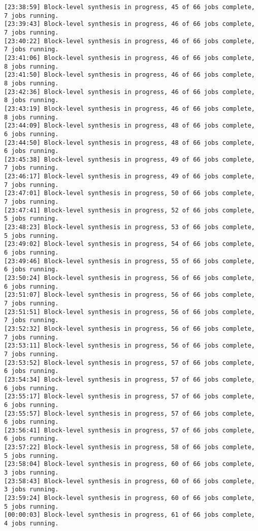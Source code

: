 \begin{lstlisting}[label=lst:code_2,caption=Содержимое файла  v++*.log]
[23:38:59] Block-level synthesis in progress, 45 of 66 jobs complete, 7 jobs running.
[23:39:43] Block-level synthesis in progress, 46 of 66 jobs complete, 7 jobs running.
[23:40:22] Block-level synthesis in progress, 46 of 66 jobs complete, 7 jobs running.
[23:41:06] Block-level synthesis in progress, 46 of 66 jobs complete, 8 jobs running.
[23:41:50] Block-level synthesis in progress, 46 of 66 jobs complete, 8 jobs running.
[23:42:36] Block-level synthesis in progress, 46 of 66 jobs complete, 8 jobs running.
[23:43:19] Block-level synthesis in progress, 46 of 66 jobs complete, 8 jobs running.
[23:44:09] Block-level synthesis in progress, 48 of 66 jobs complete, 6 jobs running.
[23:44:50] Block-level synthesis in progress, 48 of 66 jobs complete, 6 jobs running.
[23:45:38] Block-level synthesis in progress, 49 of 66 jobs complete, 7 jobs running.
[23:46:17] Block-level synthesis in progress, 49 of 66 jobs complete, 7 jobs running.
[23:47:01] Block-level synthesis in progress, 50 of 66 jobs complete, 7 jobs running.
[23:47:41] Block-level synthesis in progress, 52 of 66 jobs complete, 5 jobs running.
[23:48:23] Block-level synthesis in progress, 53 of 66 jobs complete, 5 jobs running.
[23:49:02] Block-level synthesis in progress, 54 of 66 jobs complete, 6 jobs running.
[23:49:46] Block-level synthesis in progress, 55 of 66 jobs complete, 6 jobs running.
[23:50:24] Block-level synthesis in progress, 56 of 66 jobs complete, 6 jobs running.
[23:51:07] Block-level synthesis in progress, 56 of 66 jobs complete, 7 jobs running.
[23:51:51] Block-level synthesis in progress, 56 of 66 jobs complete, 7 jobs running.
[23:52:32] Block-level synthesis in progress, 56 of 66 jobs complete, 7 jobs running.
[23:53:11] Block-level synthesis in progress, 56 of 66 jobs complete, 7 jobs running.
[23:53:52] Block-level synthesis in progress, 57 of 66 jobs complete, 6 jobs running.
[23:54:34] Block-level synthesis in progress, 57 of 66 jobs complete, 6 jobs running.
[23:55:17] Block-level synthesis in progress, 57 of 66 jobs complete, 6 jobs running.
[23:55:57] Block-level synthesis in progress, 57 of 66 jobs complete, 6 jobs running.
[23:56:41] Block-level synthesis in progress, 57 of 66 jobs complete, 6 jobs running.
[23:57:22] Block-level synthesis in progress, 58 of 66 jobs complete, 5 jobs running.
[23:58:04] Block-level synthesis in progress, 60 of 66 jobs complete, 3 jobs running.
[23:58:43] Block-level synthesis in progress, 60 of 66 jobs complete, 3 jobs running.
[23:59:24] Block-level synthesis in progress, 60 of 66 jobs complete, 5 jobs running.
[00:00:03] Block-level synthesis in progress, 61 of 66 jobs complete, 4 jobs running.

\end{lstlisting}
